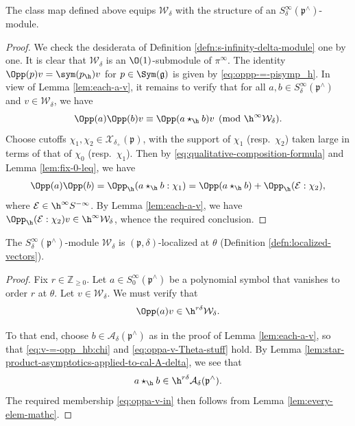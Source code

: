 \begin{lemma}\label{lem:class-map-defined-cal-W-delta-module}
  The class map defined above equips $\mathcal{W}_\delta$ with the structure of an $S_\delta^\infty(\mathfrak{p}^\wedge)$-module.
\end{lemma}
\begin{proof}
  We check the desiderata of Definition \ref{defn:s-infinity-delta-module} one by one.  It is clear that $\mathcal{W}_\delta$ is an $\O(1)$-submodule of $\pi^\infty$.  The identity $\Opp(p) v = \sym(p_{\h}) v$ for $p \in \Sym(\mathfrak{g})$ is given by \eqref{eq:oppp-=-pisymp_h}.  In view of Lemma \ref{lem:each-a-v}, it remains to verify that for all $a,b \in S^\infty_\delta(\mathfrak{p}^\wedge)$ and $v \in \mathcal{W}_\delta$, we have
  \begin{equation*}
    \Opp(a) \Opp(b) v \equiv \Opp(a \star_{\h} b) v \pmod{\h^\infty \mathcal{W}_\delta}.
  \end{equation*}
  Choose cutoffs $\chi_1, \chi_2 \in \mathcal{X}_{\delta_+}(\mathfrak{p})$, with the support of $\chi_1$ (resp.\ $\chi_2$) taken large in terms of that of $\chi_0$ (resp.\ $\chi_1$).  Then by
  \eqref{eq:qualitative-composition-formula} and Lemma \ref{lem:fix-0-leq}, we have
  \begin{equation*}
    \Opp(a) \Opp(b) = \Opp_{\h}(a \star_{\h} b: \chi_1) = \Opp(a \star_{\h} b) + \Opp_{\h}(\mathcal{E}:\chi_2),
  \end{equation*}
  where $\mathcal{E} \in \h^\infty S^{-\infty}$.  By Lemma \ref{lem:each-a-v}, we have $\Opp_{\h}(\mathcal{E}:\chi_2) v \in \h^\infty \mathcal{W}_\delta$, whence the required conclusion.
\end{proof}

\begin{proposition}\label{prop:local-with-resp-p}
  The $S^\infty_\delta(\mathfrak{p}^\wedge)$-module $\mathcal{W}_\delta$ is $(\mathfrak{p},\delta)$-localized at $\theta$ (Definition \ref{defn:localized-vectors}).
\end{proposition}
\begin{proof}
  Fix $r \in \mathbb{Z}_{\geq 0}$.  Let $a \in S^\infty_0(\mathfrak{p}^\wedge)$ be a polynomial symbol that vanishes to order $r$ at $\theta$.  Let $v \in \mathcal{W}_\delta$.  We must verify that
  \begin{equation}\label{eq:oppa-v-in}
    \Opp(a) v \in \h^{r \delta} \mathcal{W}_\delta.
  \end{equation}

  To that end, choose $b \in \mathcal{A}_\delta(\mathfrak{p}^\wedge)$ as in the proof of Lemma \ref{lem:each-a-v}, so that \eqref{eq:v-=-opp_hb:chi} and \eqref{eq:oppa-v-Theta-stuff} hold.  By Lemma \ref{lem:star-product-asymptotics-applied-to-cal-A-delta}, we see that
  \begin{equation*}
    a \star_{\h} b \in \h^{r \delta} \mathcal{A}_\delta(\mathfrak{p}^\wedge).
  \end{equation*}
  The required membership \eqref{eq:oppa-v-in} then follows from Lemma \ref{lem:every-elem-mathc}.
\end{proof}


